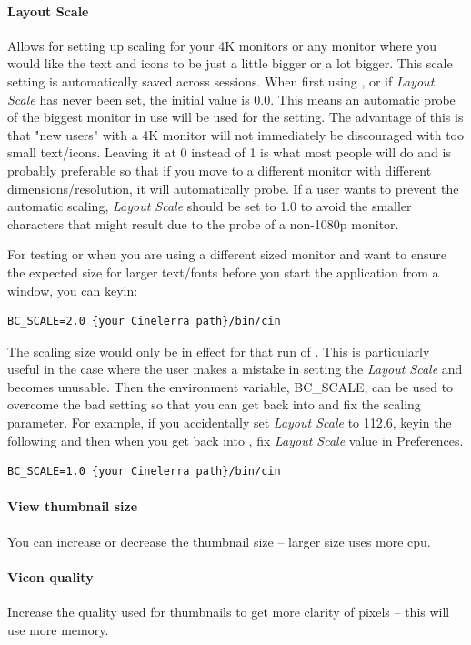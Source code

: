\paragraph{Layout Scale}  Allows for setting up scaling for your 4K monitors or any monitor where you would like the text and icons to be just a little bigger or a lot bigger. This scale setting is automatically saved across sessions. 
When first using \CGG{}, or if \textit{Layout Scale} has never been set, the initial value is 0.0.
This means an automatic probe of the biggest monitor in use will be used for the setting. The advantage of this is that "new users" with a 4K monitor will not immediately be discouraged with too small text/icons.
Leaving it at 0 instead of 1 is what most people will do and is probably preferable so that if you move to a different monitor with different dimensions/resolution, it will automatically probe. 
If a user wants to prevent the automatic scaling, \textit{Layout Scale} should be set to 1.0 to avoid the smaller characters that might result due to the probe of a non-1080p monitor.

For testing or when you are using a different sized monitor and want to ensure the expected
size for larger text/fonts before you start the application from a window, you can keyin:
\begin{lstlisting}[numbers=none]
        BC_SCALE=2.0 {your Cinelerra path}/bin/cin
\end{lstlisting}
The scaling size would only be in effect for that run of \CGG{}.  This is particularly
useful in the case where the user makes a mistake in setting the \textit{Layout Scale} and \CGG{} becomes unusable. 
Then the environment variable, BC\_SCALE, can be used to overcome the bad setting so that you can get back into
\CGG{} and fix the scaling parameter.  For example, if you 
accidentally set \textit{Layout Scale} to 112.6, keyin the following 
and then when you get back into \CGG{}, fix \textit{Layout Scale} value in Preferences.  
\begin{lstlisting}[numbers=none]
        BC_SCALE=1.0 {your Cinelerra path}/bin/cin
\end{lstlisting}
\paragraph{View thumbnail size}  You can increase or decrease the thumbnail size -- larger size uses more cpu.
\paragraph{Vicon quality}   Increase the quality used for thumbnails to get more clarity of pixels -- this will use more memory.
